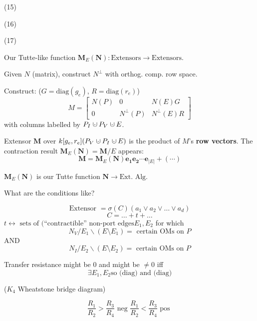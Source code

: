 \documentclass{beamer}
\newcommand{\dunion}
{\mbox{\hbox{\hskip0.45em$\cdot$\hskip-0.44em$\cup$\hskip0.2em}}}
\begin{document}


\begin{frame}{(15)}

\end{frame}

\begin{frame}{(16)}
\end{frame}

\begin{frame}{(17)}


Our Tutte-like function $\mathbf{M}_E(\mathbf{N}):\text{Extensors}\rightarrow\text{Extensors}$.

Given $N$ (matrix), construct $N^\perp$ 
with orthog. comp. row space.

Construct:  ($G=\mbox{diag}(g_e)$, $R=\mbox{diag}(r_e)$)
\[
M = \left[\begin{array}{c|c|c} N(P)  &  0  &  N(E)G \\  \hline
0  & N^{\perp}(P)  &  N^{\perp}(E)R \end{array}\right]
\]
with columns labelled by $P_I\dunion P_V\dunion E$.

Extensor $\mathbf{M}$ over $k[g_e, r_e](P_V\dunion P_I \dunion E)$
is the product of $M$'s \textbf{row vectors}. The contraction result
$\mathbf{M}_E(\mathbf{N}) = \mathbf{M}/E$ appears:
\[
\mathbf{M} = \mathbf{M}_E(\mathbf{N})\mathbf{e_1}\mathbf{e_2}\cdots\mathbf{e}_{|E|} + (\cdots) 
\]

$\mathbf{M}_E(\mathbf{N})$ is our Tutte function $\mathbf{N}\rightarrow \text{Ext. Alg.}$

\end{frame}



\begin{frame}{What are the conditions like?}

\[
\text{Extensor\ }= \sigma(C)(a_1\vee a_2\vee \ldots \vee a_d)
\]
\[
C = \ldots + t + \ldots
\]
$t \leftrightarrow \text{\ sets of (``contractible'' non-port edges} 
E_1, E_2$ for which
\[
N_V/E_1\backslash(E\setminus E_1) = \text{\ certain OMs on\ } P
\]
AND
\[
N_I/E_2\backslash(E\setminus E_2) = \text{\ certain OMs on\ } P
\]

Transfer resistance might be 0 and might be $\neq 0$ iff
\[
\exists E_1, E_2 \text{so (diag) and (diag)}
\]

($K_4$ Wheatstone bridge diagram)

\[
\frac{R_1}{R_2} > \frac{R_3}{R_4} 
\text{\ neg\ }
\frac{R_1}{R_2} < \frac{R_3}{R_4} 
\text{\ pos\ }
\]

\end{frame}
\end{document}
